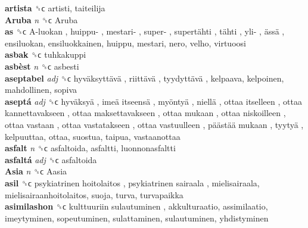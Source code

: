 \textbf{artista} ␝ϲ  artisti, taiteilija  \\
\textbf{Aruba} \emph{n}  ␝ϲ   Aruba   \\
\textbf{as} ␝ϲ   A-luokan ,  huippu- ,  mestari- ,  super- ,  supertähti ,  tähti ,  yli- ,  ässä , ensiluokan, ensiluokkainen, huippu, mestari, nero, velho, virtuoosi  \\
\textbf{asbak} ␝ϲ  tuhkakuppi  \\
\textbf{asbèst} \emph{n}  ␝ϲ  asbesti  \\
\textbf{aseptabel} \emph{adj}  ␝ϲ   hyväksyttävä ,  riittävä ,  tyydyttävä , kelpaava, kelpoinen, mahdollinen, sopiva  \\
\textbf{aseptá} \emph{adj}  ␝ϲ   hyväksyä ,  imeä itseensä ,  myöntyä ,  niellä ,  ottaa itselleen ,  ottaa kannettavakseen ,  ottaa maksettavakseen ,  ottaa mukaan ,  ottaa niskoilleen ,  ottaa vastaan ,  ottaa vastatakseen ,  ottaa vastuulleen ,  päästää mukaan ,  tyytyä , kelpuuttaa, ottaa, suostua, taipua, vastaanottaa  \\
\textbf{asfalt} \emph{n}  ␝ϲ  asfaltoida, asfaltti, luonnonasfaltti  \\
\textbf{asfaltá} \emph{adj}  ␝ϲ  asfaltoida  \\
\textbf{Asia} \emph{n}  ␝ϲ   Aasia   \\
\textbf{asil} ␝ϲ   psykiatrinen hoitolaitos ,  psykiatrinen sairaala , mielisairaala, mielisairaanhoitolaitos, suoja, turva, turvapaikka  \\
\textbf{asimilashon} ␝ϲ   kulttuuriin sulautuminen , akkulturaatio, assimilaatio, imeytyminen, sopeutuminen, sulattaminen, sulautuminen, yhdistyminen  \\
